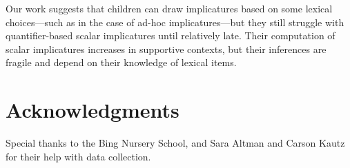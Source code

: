 \documentclass[10pt,letterpaper]{article}
\begin{document}
Our work suggests that children can draw implicatures based on some lexical choices---such as in the case of ad-hoc implicatures---but they still struggle with quantifier-based scalar implicatures until relatively late. Their computation of scalar implicatures increases in supportive contexts, but their inferences are fragile and depend on their knowledge of lexical items.

\section{Acknowledgments}

Special thanks to the Bing Nursery School, and Sara Altman and Carson Kautz for their help with data collection. 



\setlength{\bibleftmargin}{.125in} \setlength{\bibindent}{-\bibleftmargin}


\end{document}
